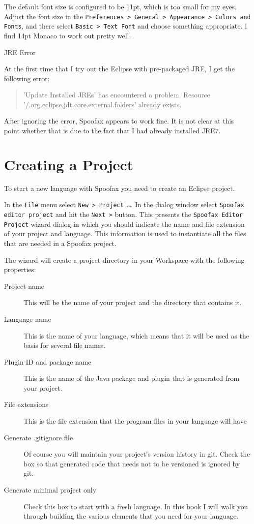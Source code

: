 The default font size is configured to be 11pt, which is too small for my eyes. 
Adjust the font size in the \texttt{Preferences > General > Appearance > Colors
and Fonts}, and there select \texttt{Basic > Text Font} and choose something
appropriate. I find 14pt Monaco to work out pretty well.

\begin{sidenote}{JRE Error}

At the first time that I try out the Eclipse with
pre-packaged JRE, I get the following error: 

\begin{quote}
'Update Installed JREs' has encountered a problem.
Resource '/.org.eclipse.jdt.core.external.folders' already exists.
\end{quote} 

\noindent
After ignoring the error, Spoofax appears to work fine. It is not clear at this
point whether that is due to the fact that I had already installed JRE7.

\end{sidenote} 

\section{Creating a Project}

To start a new language with Spoofax you need to create an Eclipse project.

In the \texttt{File} menu select \texttt{New > Project \ldots}. In the dialog
window select \texttt{Spoofax editor project} and hit the \texttt{Next >}
button. This presents the \texttt{Spoofax Editor Project} wizard dialog in
which you should indicate the name and file extension of your project
and language. This information is used to instantiate all the files that are
needed in a Spoofax project.

The wizard will create a project directory in your Workspace with the following
properties:

\begin{description}
\item[Project name] This will be the name of your project and the directory that
contains it.
\item[Language name] This is the name of your language, which means that it will
be used as the basis for several file names.
\item[Plugin ID and package name] This is the name of the Java
package and plugin that is generated from your project.
\item[File extensions] This is the file extension that the program files in
your language will have 
\item[Generate .gitignore file] Of course you will maintain your project's
version history in git. Check the box so that generated code that needs not to
be versioned is ignored by git.
\item[Generate minimal project only] Check this box to start with a fresh
language. In this book I will walk you through building the various elements
that you need for your language.
\end{description}

